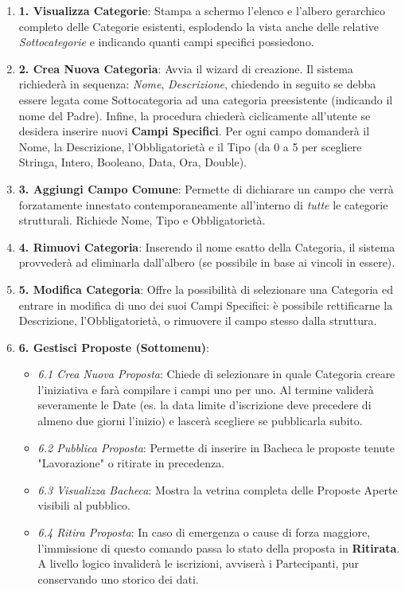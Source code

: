 \begin{enumerate}
    \item \textbf{1. Visualizza Categorie}: Stampa a schermo l'elenco e l'albero gerarchico completo delle Categorie esistenti, esplodendo la vista anche delle relative \textit{Sottocategorie} e indicando quanti campi specifici possiedono.
    \item \textbf{2. Crea Nuova Categoria}: Avvia il wizard di creazione. Il sistema richiederà in sequenza: \textit{Nome}, \textit{Descrizione}, chiedendo in seguito se debba essere legata come Sottocategoria ad una categoria preesistente (indicando il nome del Padre). Infine, la procedura chiederà ciclicamente all'utente se desidera inserire nuovi \textbf{Campi Specifici}. Per ogni campo domanderà il Nome, la Descrizione, l'Obbligatorietà e il Tipo (da 0 a 5 per scegliere Stringa, Intero, Booleano, Data, Ora, Double).
    \item \textbf{3. Aggiungi Campo Comune}: Permette di dichiarare un campo che verrà forzatamente innestato contemporaneamente all'interno di \textit{tutte} le categorie strutturali. Richiede Nome, Tipo e Obbligatorietà.
    \item \textbf{4. Rimuovi Categoria}: Inserendo il nome esatto della Categoria, il sistema provvederà ad eliminarla dall'albero (se possibile in base ai vincoli in essere).
    \item \textbf{5. Modifica Categoria}: Offre la possibilità di selezionare una Categoria ed entrare in modifica di uno dei suoi Campi Specifici: è possibile rettificarne la Descrizione, l'Obbligatorietà, o rimuovere il campo stesso dalla struttura.
    \item \textbf{6. Gestisci Proposte (Sottomenu)}:
    \begin{itemize}
        \item \textit{6.1 Crea Nuova Proposta}: Chiede di selezionare in quale Categoria creare l'iniziativa e farà compilare i campi uno per uno. Al termine validerà severamente le Date (es. la data limite d'iscrizione deve precedere di almeno due giorni l'inizio) e lascerà scegliere se pubblicarla subito.
        \item \textit{6.2 Pubblica Proposta}: Permette di inserire in Bacheca le proposte tenute "Lavorazione" o ritirate in precedenza.
        \item \textit{6.3 Visualizza Bacheca}: Mostra la vetrina completa delle Proposte Aperte visibili al pubblico.
        \item \textit{6.4 Ritira Proposta}: In caso di emergenza o cause di forza maggiore, l'immissione di questo comando passa lo stato della proposta in \textbf{Ritirata}. A livello logico invaliderà le iscrizioni, avviserà i Partecipanti, pur conservando uno storico dei dati.

\end{itemize}
\end{enumerate}

